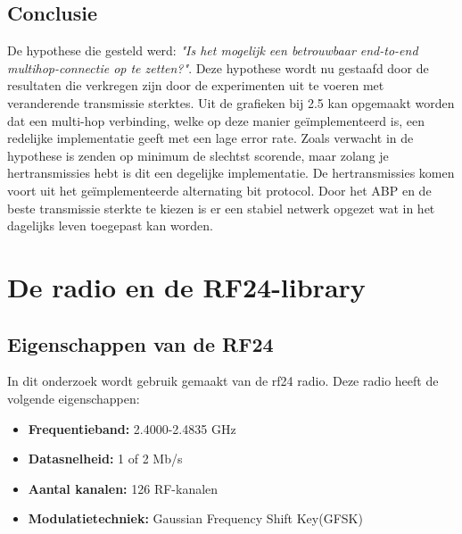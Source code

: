\documentclass{article}
\begin{document}
\subsection{Conclusie}

De hypothese die gesteld werd: \textit{"Is het mogelijk een betrouwbaar end-to-end multihop-connectie op te zetten?"}.
Deze hypothese wordt nu gestaafd door de resultaten die verkregen zijn door de experimenten uit te voeren met veranderende transmissie sterktes. 
Uit de grafieken bij 2.5 kan opgemaakt worden dat een multi-hop verbinding, welke op deze manier ge\"{i}mplementeerd is, een redelijke implementatie geeft met een lage error rate. Zoals verwacht in de hypothese is zenden op minimum de slechtst scorende, maar zolang je hertransmissies hebt is dit een degelijke implementatie. 
De hertransmissies komen voort uit het ge\"{i}mplementeerde alternating bit protocol. Door het ABP en de beste transmissie sterkte te kiezen is er een stabiel netwerk opgezet wat in het dagelijks leven toegepast kan worden. 
\clearpage




\appendix
\section{De radio en de RF24-library}
\subsection{Eigenschappen van de RF24}
In dit onderzoek wordt gebruik gemaakt van de rf24 radio. Deze radio heeft de volgende eigenschappen:
	\begin{itemize}	
	\item\textbf{Frequentieband: }2.4000-2.4835 GHz
	\item\textbf{Datasnelheid: }1 of 2 Mb/s
	\item\textbf{Aantal kanalen: }126 RF-kanalen
	\item\textbf{Modulatietechniek: }Gaussian Frequency Shift Key(GFSK)
	\end{itemize}
	
\end{document}
